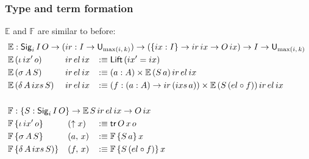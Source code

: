 \documentclass[acmsmall,screen,review]{acmart}
\newcommand{\msf}[1]{{\mathsf{#1}}}
\newcommand{\mbb}[1]{\mathbb{#1}}
\newcommand{\U}{\msf{U}}
\newcommand{\Lift}{\msf{Lift}}
\newcommand{\lup}{\uparrow}
\newcommand{\Sig}{\msf{Sig}}
\newcommand{\ir}{{ir}}
\newcommand{\el}{{el}}
\newcommand{\ix}{{ix}}
\newcommand{\ixs}{{ixs}}
\newcommand{\tr}{\msf{tr}}
\newcommand{\E}{\mbb{E}}
\newcommand{\F}{\mbb{F}}
\begin{document}
\subsubsection{Type and term formation}\label{sec:iir-type-and-term-formation}
$\E$ and $\F$ are similar to before:
\begin{alignat*}{4}
  &\hspace{-2em}\rlap{$\E : \Sig_i\,I\,O \to (\ir : I \to \U_{\max(i,\,k)}) \to (\{\ix : I\} \to \ir\,\ix \to O\,\ix) \to I \to \U_{\max(i,\,k)}$} \\
  &\hspace{-2em}\E\,(\iota\,\ix'\,o)     \,&&\hspace{-0.4em}\ir\,\el\,\ix &&\hspace{-0.2em} :\equiv \Lift\,(\ix' = \ix)\\
  &\hspace{-2em}\E\,(\sigma\,A\,S)     \,&&  \hspace{-0.4em}\ir\,\el\,\ix &&\hspace{-0.2em} :\equiv (a : A) \times \E\,(S\,a)\,\ir\,\el\,\ix\\
  &\hspace{-2em}\E\,(\delta\,A\,\ixs\,S)\,&&  \hspace{-0.4em}\ir\,\el\,\ix &&\hspace{-0.2em} :\equiv (f : (a : A) \to \ir\,(\ixs\,a)) \times \E\,(S\,(\el \circ f))\,\ir\,\el\,\ix\\
  &\hspace{-2em} && &&\\
  &\hspace{-2em}\rlap{$\F : \{S : \Sig_i\,I\,O\} \to \E\,S\,\ir\,\el\,\ix \to O\,\ix$} \\
  &\hspace{-2em}\F\,\{\iota\,\ix'\,o      \}\,&&\hspace{-0.1em}(\lup x) && \hspace{-0.2em}:\equiv \tr\,O\,x\,o\\
  &\hspace{-2em}\F\,\{\sigma\,A\,S      \}\,&&\hspace{-0.1em}(a,\,x)  && \hspace{-0.2em}:\equiv \F\,\{S\,a\}\,x\\
  &\hspace{-2em}\F\,\{\delta\,A\,\ixs\,S)\}\,&&\hspace{-0.1em}(f,\,x)  && \hspace{-0.2em}:\equiv \F\,\{S\,(\el \circ f)\}\,x
\end{alignat*}
\end{document}
